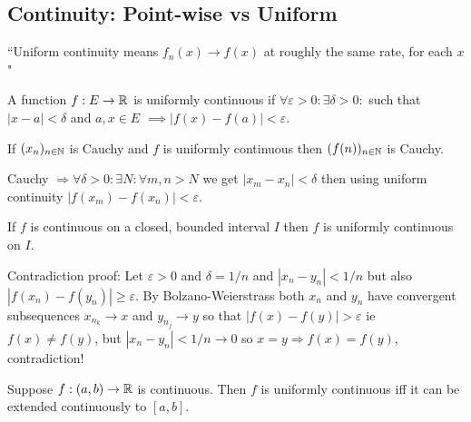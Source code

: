 \dotfill
\begin{multicols}{2}
\subsection*{Continuity: Point-wise vs Uniform}
\scriptsize{``Uniform continuity means $f_n(x)\to f(x)$ at roughly the same rate, for each $x$"}\small
\begin{definition}
A function $f:E\to\mathbb{R}$ is uniformly continuous if $\forall\varepsilon>0: \exists\delta>0:$ such that $|x-a|<\delta$ and $a,x\in E$ $\implies|f(x)-f(a)|<\varepsilon$.
\end{definition}

\begin{theorem}[3.38]
If $(x_n)_{n\in\mathbb{N}}$ is Cauchy and $f$ is uniformly continuous then $(f(n))_{n\in\mathbb{N}}$ is Cauchy.
\end{theorem}
\begin{proof1}
Cauchy $\Rightarrow\forall\delta>0:\exists N:\forall m,n>N$ we get $|x_m-x_n|<\delta$ then using uniform continuity $|f(x_m)-f(x_n)|<\varepsilon$. 
\end{proof1}

\begin{theorem}[3.39]
If $f$ is continuous on a closed, bounded interval $I$ then $f$ is uniformly continuous on $I$.
\end{theorem}
\begin{proof1}
Contradiction proof: Let $\varepsilon>0$ and $\delta=1/n$ and $|x_n-y_n|<1/n$ but also $|f(x_n)-f(y_n)|\geq\varepsilon$. By Bolzano-Weierstrass both $x_n$ and $y_n$ have convergent subsequences $x_{n_k}\to x$ and $y_{n_j}\to y$ so that $|f(x)-f(y)|>\varepsilon$ ie $f(x)\neq f(y)$, but $|x_n-y_n|<1/n\to 0$ so $x=y\Rightarrow f(x)=f(y)$, contradiction!  
\end{proof1}

\begin{theorem}
Suppose $f:(a,b)\to\mathbb{R}$ is continuous. Then $f$ is uniformly continuous iff it can be extended continuously to $[a,b]$.
\end{theorem}
\end{multicols}